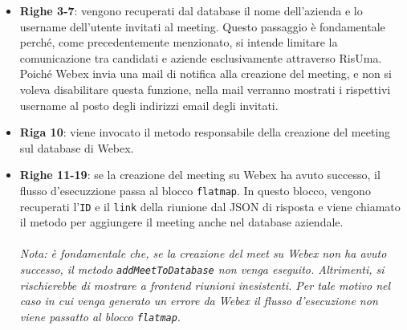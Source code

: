 \begin{itemize}
    \item \textbf{Righe 3-7}: vengono recuperati dal database il nome dell'azienda e lo username dell'utente invitati al meeting. 
    Questo passaggio è fondamentale perché, come precedentemente menzionato, si intende limitare la comunicazione tra candidati 
    e aziende esclusivamente attraverso RisUma. Poiché Webex invia una mail di notifica alla creazione del meeting, e non si voleva
    disabilitare questa funzione, nella mail verranno mostrati i rispettivi username al posto degli indirizzi email degli invitati.

    \item \textbf{Riga 10}: viene invocato il metodo responsabile della creazione del meeting sul database di Webex.

    \item \textbf{Righe 11-19}: se la creazione del meeting su Webex ha avuto successo, il flusso d'esecuzzione passa al 
    blocco \texttt{flatmap}. In questo blocco, vengono recuperati l'\texttt{ID} e il \texttt{link} della riunione dal JSON di risposta 
    e viene chiamato il metodo per aggiungere il meeting anche nel database aziendale.
    \\
    \\
    \textit{Nota: è fondamentale che, se la creazione del meet su Webex non ha avuto successo, il metodo
    \texttt{addMeetToDatabase} non venga eseguito. Altrimenti, si rischierebbe di mostrare a frontend riunioni inesistenti.
    Per tale motivo nel caso in cui venga generato un errore da Webex il flusso d'esecuzione non viene passatto al blocco \texttt{flatmap}}.
\end{itemize}